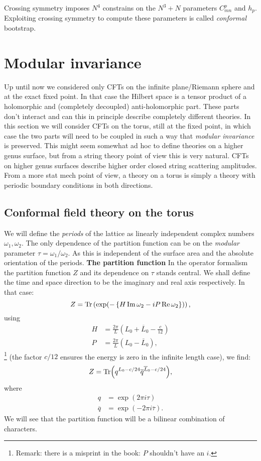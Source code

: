 \documentclass[submission, PhysLectNotes]{SciPost}
\begin{document}
Crossing symmetry imposes $N^4$ constrains on the $N^3 + N$ parameters $C_{mn}^p$ and $h_p$. Exploiting crossing symmetry to compute these parameters is called \emph{conformal} bootstrap.

\section{Modular invariance}
Up until now we considered only CFTs on the infinite plane/Riemann sphere and at the exact fixed point. In that case the Hilbert space is a tensor product of a holomorphic and (completely decoupled) anti-holomorphic part. These parts don't interact and can this in principle describe completely different theories. In this section we will consider CFTs on the torus, still at the fixed point, in which case the two parts will need to be coupled in such a way that \emph{modular invariance} is preserved. This might seem somewhat ad hoc to define theories on a higher genus surface, but from a string theory point of view this is very natural. CFTs on higher genus surfaces describe higher order closed string scattering amplitudes. From a more stat mech point of view, a theory on a torus is simply a theory with periodic boundary conditions in both directions.
\subsection{Conformal field theory on the torus}
We will define the \emph{periods} of the lattice as linearly independent complex numbers $\omega_1,\omega_2$. The only dependence of the partition function can be on the \emph{modular} parameter $\tau=\omega_1/\omega_2$. As this is independent of the surface area and the absolute orientation of the periods.
{\bf The partition function}
In the operator formalism the partition function $Z$ and its dependence on $\tau$ stands central. We shall define the time and space direction to be the imaginary and real axis respectively. In that case:
\begin{equation}
	Z=\Tr\left(\exp(-\left\{H\Im\omega_2-iP\Re\omega_2\right\})\right),
\end{equation}
using
\begin{align}
	H &=  \frac{2\pi}{L}\left(L_0 + \overline L_0 -\frac{c}{12}\right)\\
	P &=  \frac{2\pi}{L}\left(L_0 - \overline L_0\right),
\end{align}
\footnote{{\color{red}Remark:} there is a misprint in the book: $P$ shouldn't have an $i$.} (the factor $c/12$ ensures the energy is zero in the infinite length case), we find:
\begin{equation}
	Z = \Tr(q^{L_0 - c/24}\overline q^{\overline L_0 -c/24}),
\end{equation}
where
\begin{align}
	q &= \exp(2\pi i\tau)\\
	\overline q &= \exp(-2\pi i\overline \tau).
\end{align}
We will see that the partition function will be a bilinear combination of characters.
\end{document}
